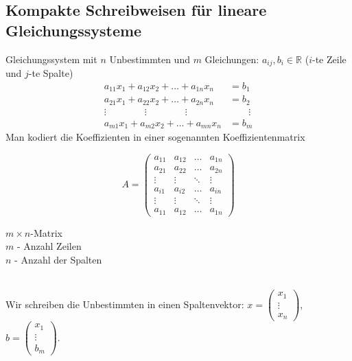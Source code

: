 \documentclass[12pt,a4paper]{article}
\theoremstyle{plain}
\newcommand{\R}{\mathbb{R}}
\numberwithin{equation}{section}
\begin{document}
\subsection{Kompakte Schreibweisen für lineare Gleichungssysteme}
Gleichungssystem mit $n$ Unbestimmten und $m$ Gleichungen: $a_{ij},b_i\in\R$ ($i$-te Zeile und $j$-te Spalte) \begin{align}
a_{11}x_1+a_{12}x_2+\ldots+a_{1n}x_n&=b_1 \nonumber \\ 
a_{21}x_1+a_{22}x_2+\ldots+a_{2n}x_n&=b_2  \nonumber\\ 
\vdots\qquad\qquad \vdots \qquad\qquad \vdots \qquad&\qquad \vdots \nonumber\\ 
a_{m1}x_1+a_{m2}x_2+\ldots+a_{mn}x_n&=b_m \nonumber
\end{align}
Man kodiert die Koeffizienten in einer sogenannten Koeffizientenmatrix\\
\begin{minipage}{8cm}\[
A=\left(\begin{matrix}
a_{11} & a_{12} & \ldots & a_{1n} \\
a_{21} & a_{22} & \ldots & a_{2n} \\
\vdots & \vdots & \ddots & \vdots \\
a_{i1} & a_{i2} & \ldots & a_{in} \\
\vdots & \vdots & \ddots & \vdots \\
a_{11} & a_{12} & \ldots & a_{1n} 
\end{matrix} \right)
\]
\end{minipage} \begin{minipage}{5cm}$m\times n$-Matrix \\
$m$ - Anzahl Zeilen \\
$n$ - Anzahl der Spalten
\end{minipage}\\
Wir schreiben die Unbestimmten in einen Spaltenvektor: $x=\left(\begin{array}{c}x_1\\  \vdots\\x_n\end{array}\right)$, $b=\left(\begin{array}{c} x_1 \\ \vdots \\b_m\end{array} \right)$.
\end{document}
